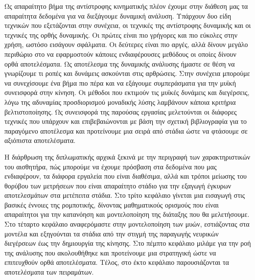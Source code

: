 Ως απαραίτητο βήμα της αντίστροφης κινηματικής πλέον έχουμε στην διάθεση μας τα απαραίτητα δεδομένα για να διεξάγουμε δυναμική ανάλυση. Υπάρχουν δυο είδη τεχνικών που εξετάζονται στην συνέχεια, οι τεχνικές της αντίστροφης δυναμικής και οι τεχνικές της ορθής δυναμικής. Οι πρώτες είναι πιο γρήγορες και πιο εύκολες στην χρήση, ωστόσο εισάγουν σφάλματα. Οι δεύτερες είναι πιο αργές, αλλά δίνουν μεγάλο περιθώριο στο να εφαρμοστούν κάποιες ενδιαφέρουσες μεθόδους οι οποίες δίνουν ορθά αποτελέσματα. Ως αποτέλεσμα της δυναμικής ανάλυσης ήμαστε σε θέση να γνωρίζουμε τι ροπές και δυνάμεις ασκούνται στις αρθρώσεις. Στην συνέχεια μπορούμε να συνεχίσουμε ένα βήμα πιο πέρα και να εξάγουμε συμπεράσματα για την μυϊκή συνεισφορά στην κίνηση. Οι μέθοδοι που εκτιμούν τις μυϊκές δυνάμεις και διεγέρσεις, λόγω της αδυναμίας προσδιορισμού μοναδικής λύσης λαμβάνουν κάποια κριτήρια βελτιστοποίησης. Ως συνεισφορά της παρούσας εργασίας μελετούνται οι διάφορες τεχνικές που υπάρχουν και επιβεβαιώνονται με βάση την σχετική βιβλιογραφία για το παραγόμενο αποτέλεσμα και προτείνουμε μια σειρά από στάδια ώστε να φτάσουμε σε αξιόπιστα αποτελέσματα.

Η διάρθρωση της διπλωματικής αρχικά ξεκινά με την περιγραφή των χαρακτηριστικών του αισθητήρα, πώς μπορούμε να έχουμε πρόσβαση στα δεδομένα που μας ενδιαφέρουν, τα διάφορα εργαλεία που είναι διαθέσιμα, αλλά και τρόποι μείωσης του θορύβου των μετρήσεων που είναι απαραίτητο στάδιο για την εξαγωγή έγκυρων αποτελεσμάτων στα μετέπειτα στάδια. Στο τρίτο κεφάλαιο γίνεται μια εισαγωγή στις βασικές έννοιες της ρομποτικής, δίνοντας μαθηματικούς ορισμούς που είναι απαραίτητοι για την κατανόηση και μοντελοποίηση της διάταξης που θα μελετήσουμε. Στο τέταρτο κεφάλαιο αναφερόμαστε στην μοντελοποίηση των μυών, εστιάζοντας στα μοντέλα  και εξηγούνται τα στάδια από την στιγμή της παραγωγής νευρικών διεγέρσεων έως την δημιουργία της κίνησης. Στο πέμπτο κεφάλαιο μιλάμε για την ροή της ανάλυσης που ακολουθήθηκε και προτείνουμε μια στρατηγική ώστε να επιτευχθούν ορθά αποτελέσματα. Τέλος, στο έκτο κεφάλαιο παρουσιάζονται τα αποτελέσματα των πειραμάτων.

